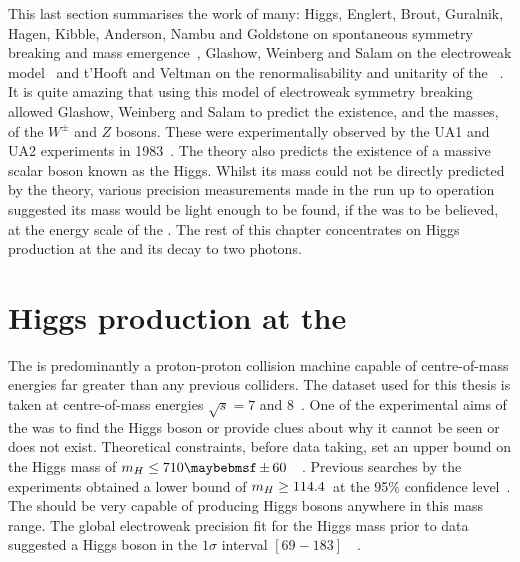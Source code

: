This last section summarises the work of many: Higgs, Englert, Brout, Guralnik, Hagen, Kibble, Anderson, Nambu and Goldstone on spontaneous symmetry breaking and mass emergence~\cite{englert-brout,HagenKibble,Higgs:1964ia,Higgs,Nambu,Goldstone,Anderson}, Glashow, Weinberg and Salam on the electroweak model~\cite{Glashow,Weinberg,Salam} and t'Hooft and Veltman on the renormalisability and unitarity of the \SM~\cite{tHooft:1972fi,Hooft1971167}. It is quite amazing that using this model of electroweak symmetry breaking allowed Glashow, Weinberg and Salam to predict the existence, and the masses, of the $W^{\pm}$ and $Z$ bosons. These were experimentally observed by the UA1 and UA2 experiments in 1983~\cite{ua1,ua2}. The theory also predicts the existence of a massive scalar boson known as the Higgs. Whilst its mass could not be directly predicted by the theory, various precision measurements made in the run up to \LHC operation suggested its mass would be light enough to be found, if the \SM was to be believed, at the energy scale of the \LHC. The rest of this chapter concentrates on Higgs production at the \LHC and its decay to two photons.

\section{Higgs production at the \LHC}

The \LHC is predominantly a proton-proton collision machine capable of centre-of-mass energies far greater than any previous colliders. The dataset used for this thesis is taken at centre-of-mass energies $\sqrt{s}=7$ and 8~\TeV. One of the experimental aims of the \LHC was to find the Higgs boson or provide clues about why it cannot be seen or does not exist. Theoretical constraints, before \LHC data taking, set an upper bound on the \SM Higgs mass of $\mH\leq710\pm60$~\GeV~\cite{upper-higgs-bound}. Previous searches by the \LEP experiments obtained a lower bound of $m_{H}\geq114.4$~\GeV at the 95\% confidence level~\cite{lep-higgs}. The \LHC should be very capable of producing \SM Higgs bosons anywhere in this mass range. The global electroweak precision fit for the Higgs mass prior to \LHC data suggested a \SM Higgs boson in the $1\sigma$ interval $[69-183]$~\GeV~\cite{ewfits}.

